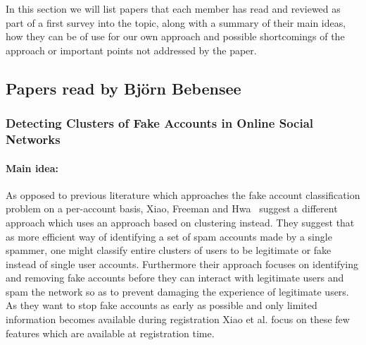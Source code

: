 In this section we will list papers that each member has read and reviewed as part of a first survey into the topic, along with a summary of their main ideas, how they can be of use for our own approach and possible shortcomings of the approach or important points not addressed by the paper.


\subsection{Papers read by Björn Bebensee}

\subsubsection{Detecting Clusters of Fake Accounts in Online Social Networks}

\paragraph{Main idea:}
As opposed to previous literature which approaches the fake account classification problem on a per-account basis, Xiao, Freeman and Hwa~\cite{xiao2015detecting} suggest a different approach which uses an approach based on clustering instead. They suggest that as more efficient way of identifying a set of spam accounts made by a single spammer, one might classify entire clusters of users to be legitimate or fake instead of single user accounts. Furthermore their approach focuses on identifying and removing fake accounts before they can interact with legitimate users and spam the network so as to prevent damaging the experience of legitimate users. As they want to stop fake accounts as early as possible and only limited information becomes available during registration Xiao et al. focus on these few features which are available at registration time.

